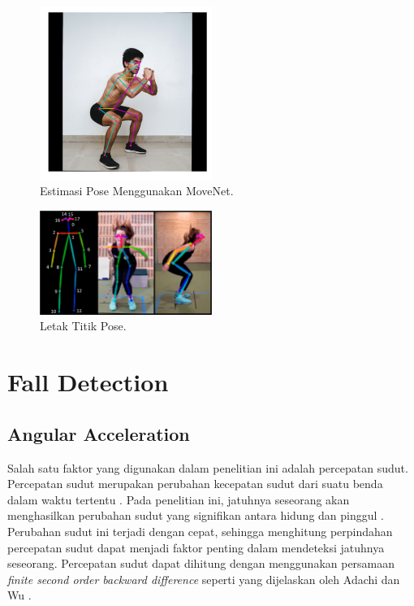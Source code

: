 \documentclass[conference]{IEEEtran}
\begin{document}
\begin{figure}[htbp]
    \centerline{\includegraphics[width=0.5\textwidth]{figures/movenet1.png}}
    \caption{Estimasi Pose Menggunakan MoveNet.}
\end{figure}

\begin{figure}[htbp]
    \centerline{\includegraphics[width=0.5\textwidth]{figures/movenet2.png}}
    \caption{Letak Titik Pose.}
\end{figure}

\section{Fall Detection}
\subsection{Angular Acceleration}
Salah satu faktor yang digunakan dalam penelitian ini adalah percepatan sudut. Percepatan sudut merupakan perubahan kecepatan sudut dari suatu benda dalam waktu tertentu \cite{adachi2007fall}. Pada penelitian ini, jatuhnya seseorang akan menghasilkan perubahan sudut yang signifikan antara hidung dan pinggul \cite{liu2018fall}. Perubahan sudut ini terjadi dengan cepat, sehingga menghitung perpindahan percepatan sudut dapat menjadi faktor penting dalam mendeteksi jatuhnya seseorang. Percepatan sudut dapat dihitung dengan menggunakan persamaan \textit{finite second order backward difference} seperti yang dijelaskan oleh Adachi dan Wu \cite{adachi2007fall}.
\end{document}
